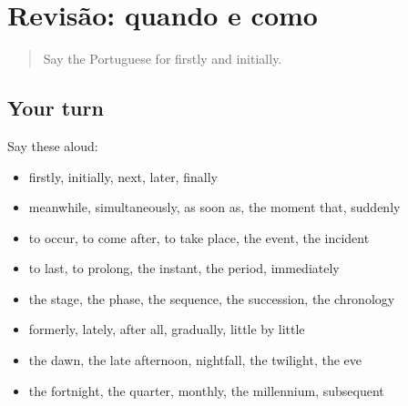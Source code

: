 \section[(dialogue)]{Revisão: quando e como}

\label{lesson:PT-R276-revisao-269-276}



\begin{quote}
Say the Portuguese for firstly and initially.
\end{quote}

\subsection*{Your turn}
Say these aloud:

\begin{itemize}
\raggedright
  \item firstly, initially, next, later, finally
  \item meanwhile, simultaneously, as soon as, the moment that, suddenly
  \item to occur, to come after, to take place, the event, the incident
  \item to last, to prolong, the instant, the period, immediately
  \item the stage, the phase, the sequence, the succession, the chronology
  \item formerly, lately, after all, gradually, little by little
  \item the dawn, the late afternoon, nightfall, the twilight, the eve
  \item the fortnight, the quarter, monthly, the millennium, subsequent
\end{itemize}

